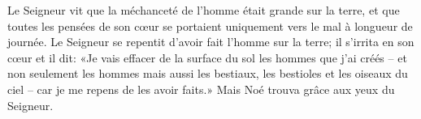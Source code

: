 Le Seigneur vit que la méchanceté de l’homme était grande sur la terre,
	et que toutes les pensées de son cœur
	se portaient uniquement vers le mal à longueur de journée.
Le Seigneur se repentit d’avoir fait l’homme sur la terre;
	il s’irrita en son cœur et il dit:
	«Je vais effacer de la surface du sol les hommes que j’ai créés
	– et non seulement les hommes mais aussi les bestiaux,
	les bestioles et les oiseaux du ciel –
	car je me repens de les avoir faits.»
Mais Noé trouva grâce aux yeux du Seigneur.
